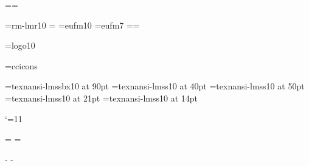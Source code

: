 







\newdimen\hpage \newdimen\vpage %
\hpage=6in \vpage=9in

\ifcase\pdfoutput
 \else
 \pdfpageheight=\vpage \pdfpagewidth=\hpage \fi

\def\[{\string\[} %
\def\pdfout#1#2#3{\ifnum#1=1 ^^a7#3 #2\else #2\fi}
\files


\lmfonts\lmtitles\ansifont
 \font\tenrm=rm-lmr10 =\tenrm
\font\frakx=eufm10
\font\frakvii=eufm7
\newfam\frakfam \textfont\frakfam=\frakx \scriptfont\frakfam=\frakvii
\def\frak{\fam\frakfam\frakx}

\font\logo=logo10

\font\ccicons=ccicons
\def\ccbysa{{\ccicons \char0\kern1pt\char1\kern1pt\char2}}

\font\ptitlefont=texnansi-lmssbx10 at 90pt
\font\psubtitlefont=texnansi-lmss10 at 40pt
\font\pauthorfont=texnansi-lmss10 at 50pt
\font\pcitafont=texnansi-lmss10 at 21pt
\font\ptextfont=texnansi-lmss10 at 14pt


\catcode`\@=11


\let\docinfo\relax \let\infodoc\relax

\headline={\hfil}
\footline={\tenrm\ifodd\pageno \docinfo\hfil\folio
            \else \folio\hfil\infodoc \fi\strut}

\hsize=10.5cm
 \hoffset\hpage \advance\hoffset-\hsize \divide{}
 \advance\hoffset-1in
\baselineskip \advance\vsize\topskip %
 \voffset\vpage \advance\voffset-\vsize \advance{}\baselineskip
 \divide{} \advance\voffset-1in

\]
